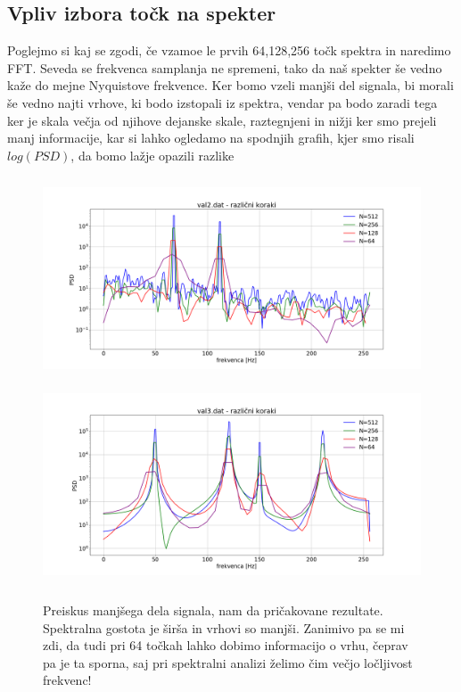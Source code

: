 \documentclass[11pt, a4paper]{article}
\begin{document}
\subsection{Vpliv izbora točk na spekter}
Poglejmo si kaj se zgodi, če vzamoe le prvih 64,128,256 točk spektra in naredimo FFT. Seveda se frekvenca samplanja ne spremeni, tako da naš spekter še vedno kaže do mejne Nyquistove frekvence. Ker bomo vzeli manjši del signala, bi morali še vedno najti vrhove, ki bodo izstopali iz spektra, vendar pa bodo zaradi tega ker je skala večja od njihove dejanske skale, raztegnjeni in nižji ker smo prejeli manj informacije, kar si lahko ogledamo na spodnjih grafih, kjer smo risali $log(PSD)$, da bomo lažje opazili razlike
\begin{figure}[H]
\centering
\includegraphics[width=14cm, height=6cm]{prva_drugi1.png}
\includegraphics[width=13.5cm, height=6cm]{prva_drugi2.png}
\caption{Preiskus manjšega dela signala, nam da pričakovane rezultate. Spektralna gostota je širša in vrhovi so manjši. Zanimivo pa se mi zdi, da tudi pri 64 točkah lahko dobimo informacijo o vrhu, čeprav pa je ta sporna, saj pri spektralni analizi želimo čim večjo ločljivost frekvenc! }  
\end{figure}
\end{document}
